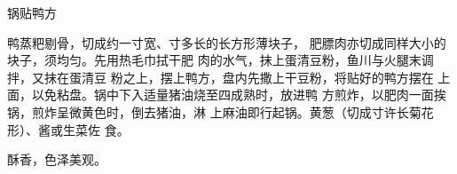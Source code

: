 \begin{recipe}{锅贴鸭方}

\ingredients


\cooking

鸭蒸粑剔骨，切成约一寸宽、寸多长的长方形薄块子， 肥膘肉亦切成同样大小的块子，须均匀。先用热毛巾拭干肥 肉的水气，抹上蛋清豆粉，鱼川与火腿末调拌，又抹在蛋清豆 粉之上，摆上鸭方，盘内先撒上干豆粉，将贴好的鸭方摆在 上面，以免粘盘。锅中下入适量猪油烧至四成熟时，放进鸭 方煎炸，以肥肉一面挨锅，煎炸呈微黄色时，倒去猪油，淋 上麻油即行起锅。黄葱（切成寸许长菊花形）、酱或生菜佐 食。

\notes

酥香，色泽美观。

\end{recipe}


